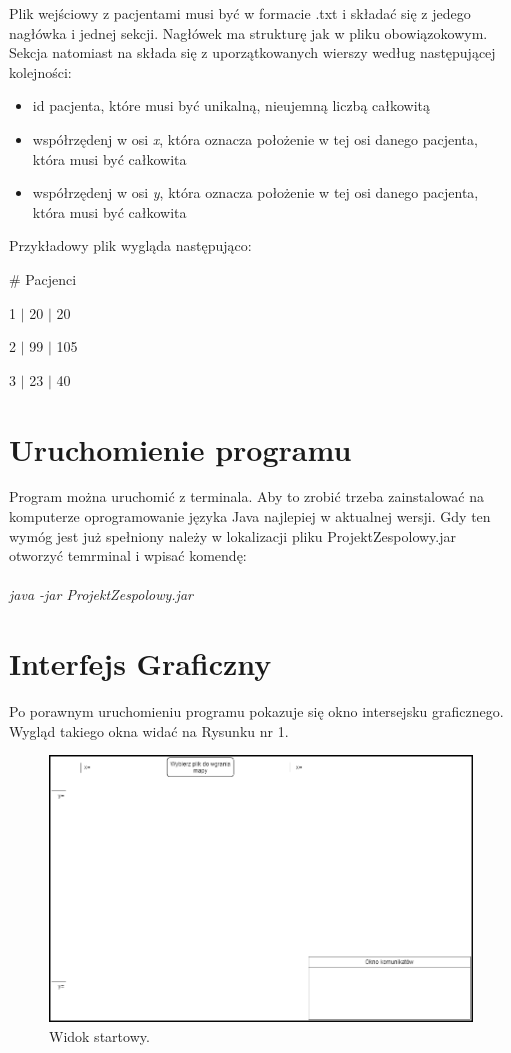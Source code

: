 \documentclass[10pt,a4paper]{article}
\begin{document}
Plik wejściowy z pacjentami musi być w formacie .txt i składać się z jedego nagłówka i jednej sekcji. Nagłówek ma strukturę jak w pliku obowiązokowym. Sekcja natomiast na składa się z uporzątkowanych wierszy według następującej kolejności:
\begin{itemize}
\item id pacjenta, które musi być unikalną, nieujemną liczbą całkowitą
\item współrzędenj w osi \textit{x}, która oznacza położenie w tej osi danego pacjenta, która musi być całkowita
\item współrzędenj w osi \textit{y}, która oznacza położenie w tej osi danego pacjenta, która musi być całkowita
\end{itemize}
Przykładowy plik wygląda następująco:
\begin{description}[style=multiline,leftmargin=3cm]
\item \# Pacjenci
\item 1 $\mid$ 20 $\mid$ 20
\item 2 $\mid$ 99 $\mid$ 105
\item 3 $\mid$ 23 $\mid$ 40
\end{description}

\section{Uruchomienie programu}

Program można uruchomić z terminala. Aby to zrobić trzeba zainstalować na komputerze oprogramowanie języka Java najlepiej w aktualnej wersji. Gdy ten wymóg jest już spełniony należy w lokalizacji pliku ProjektZespolowy.jar otworzyć temrminal i wpisać komendę: \\
\\
\textsl{java -jar ProjektZespolowy.jar}

\section{Interfejs Graficzny}

Po porawnym uruchomieniu programu pokazuje się okno intersejsku graficznego. Wygląd takiego okna widać na Rysunku nr 1.

\begin{figure}[h]
  \includegraphics[width=\linewidth]{./images/startowy_widok.png}
  \caption{Widok startowy.}
  \label{fig:GUIstart}
\end{figure}
\end{document}
